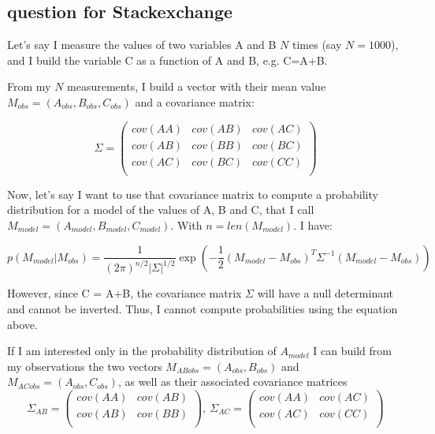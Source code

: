 \documentclass[11pt]{scrartcl}
\begin{document}
\subsection{question for Stackexchange}

Let's say I measure the values of two variables A and B $N$ times
(say $N=1000$), and I build the variable C as a function of A and B, 
e.g. C=A+B.

From my $N$ measurements, I build a vector 
with their mean value $M_{obs}=(A_{obs}, B_{obs}, C_{obs})$ and a 
covariance matrix:

\begin{equation*}
\Sigma=
  \begin{pmatrix}
    cov(AA) & cov(AB) & cov(AC) \\
    cov(AB) & cov(BB) & cov(BC) \\
    cov(AC) & cov(BC) & cov(CC) \\      
  \end{pmatrix}
\end{equation*}


Now, let's say I want to use that covariance matrix to compute a 
probability distribution for a model of the values of A, B and C, that 
I call $M_{model} = (A_{model}, B_{model}, C_{model})$. With 
$n=len(M_{model})$. I have:

\begin{equation*}
p(M_{model} |M_{obs}) = \frac{1}{(2 \pi)^{n/2} 
|\Sigma|^{1/2}}\exp\left( -\frac{1}{2} 
(M_{model}-M_{obs})^T\Sigma^{-1}(M_{model}-M_{obs}) \right)
\end{equation*}


However, since C = A+B, the covariance matrix $\Sigma$ will have a null 
determinant and cannot be inverted. Thus, I cannot compute 
probabilities 
using the equation above.

If I am interested only in the probability distribution of $A_{model}$ I 
can build from my observations the two 
vectors $M_{ABobs}=(A_{obs}, B_{obs})$ and $M_{ACobs} = (A_{obs}, 
C_{obs})$, as well as their associated covariance matrices
\begin{equation*}
\Sigma_{AB}=
  \begin{pmatrix}
    cov(AA) & cov(AB) \\
    cov(AB) & cov(BB) \\     
  \end{pmatrix}
,\ \Sigma_{AC}=
  \begin{pmatrix}
    cov(AA) & cov(AC) \\
    cov(AC) & cov(CC) \\   
  \end{pmatrix}  
\end{equation*}
\end{document}

